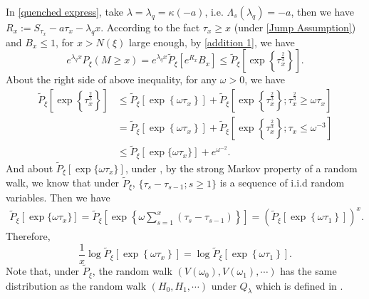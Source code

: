 \documentclass[]{article}
\numberwithin{equation}{section}
\theoremstyle{thmstyleone}%
\theoremstyle{thmstyletwo}%
\theoremstyle{thmstylethree}%
\theoremstyle{thmstylefour}%
\theoremstyle{thmstylefive}%
\theoremstyle{thmstylesix}%
\begin{document}
	In \cref{quenched express}, take $\lambda = \lambda_q = \kappa(-a)$, i.e. $\Lambda_s(\lambda_q) = -a$, then we have $R_x:= S_{\tau_x} -a\tau_x -\lambda_q x$.
	According to the fact $ \tau_x\geqslant x$ (under \cref{Jump Assumption}) and $B_x\leqslant 1$, for $x>N(\xi)$ large enough, by \cref{addition 1}, we have
	\begin{equation}\label{addition 2}
		e^{\lambda_q x} P_\xi(M\geqslant x)
		=
		e^{\lambda_q x} \tilde{P}_\xi\left[
		e^{R_x} B_x
		\right]
		\leqslant \tilde{P}_\xi 
		\left[
		\exp\left\{\tau_x^{\frac{2}{3}}\right\}
		\right].
	\end{equation}
	About the right side of above inequality, for any $\omega>0$, we have
	\begin{align}
		\tilde{P}_\xi 
		\left[
		\exp\left\{\tau_x^{\frac{2}{3}}\right\}
		\right]&\leqslant\tilde{P}_\xi 
		\left[
		\exp\left\{\omega \tau_x\right\}\right]
		+
		\tilde{P}_\xi\left[\exp\left\{\tau_x^{\frac{2}{3}}\right\};\tau_x^{\frac{2}{3}}\geqslant \omega \tau_x\right]
		\nonumber\\
		&= \tilde{P}_\xi 
		\left[
		\exp\left\{\omega \tau_x\right\}\right] + \tilde{P}_\xi\left[\exp\left\{\tau_x^{\frac{2}{3}}\right\};\tau_x\leqslant \omega^{-3}\right]
		\nonumber\\
		&\leqslant
		\tilde{P}_\xi 
		\left[
		\exp\{\omega \tau_x\}\right] + e^{\omega^{-2}}.
		\label{addition 3}
	\end{align}
	And about $\tilde{P}_\xi 
	\left[
	\exp\{\omega \tau_x\}\right]$, under , by the strong Markov property of a random walk, we know that under $\tilde{P}_\xi$,  $\{\tau_s-\tau_{s-1};s\geqslant 1\}$ is a sequence of i.i.d random variables. Then we have
	\begin{align*}
		\tilde{P}_\xi 
		\left[
		\exp\{\omega \tau_x\}\right] 
		=
		\tilde{P}_\xi 
		\left[ 
		\exp\left\{\omega \sum\limits_{s=1}^x (\tau_s-\tau_{s-1})\right\}\right]
		=
		\left(\tilde{P}_\xi 
		\left[ 
		\exp\left\{\omega \tau_1\right\}\right]\right)^x.
	\end{align*}
	Therefore, 
	\begin{equation*}
		\frac{1}{x}\log \tilde{P}_\xi 
		\left[
		\exp\left\{\omega \tau_x\right\}\right] = \log \tilde{P}_\xi 
		\left[ 
		\exp\left\{\omega \tau_1\right\}\right].
	\end{equation*}
	Note that, under $\tilde{P}_\xi$, the random walk $\left( V(\omega_0),V(\omega_1),\cdots \right)$ has the same distribution as the random walk $(H_0,H_1,\cdots)$ under $ Q_\lambda $ which is defined in .
\end{document}
